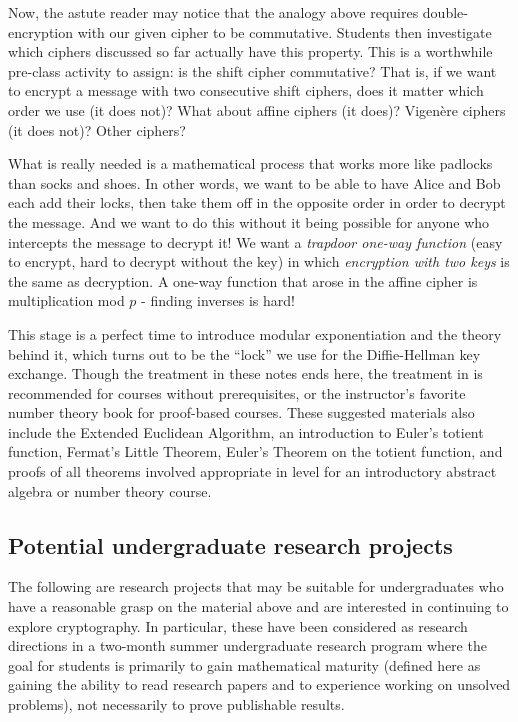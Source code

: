 \documentclass[11pt]{article}
\theoremstyle{plain}
\theoremstyle{remark}
\theoremstyle{definition}
\theoremstyle{definition}
\theoremstyle{definition}
\theoremstyle{plain}
\theoremstyle{plain}
\theoremstyle{plain}
\theoremstyle{definition}
\begin{document}
Now, the astute reader may notice that the analogy above requires
double-encryption with our given cipher to be commutative. Students
then investigate which ciphers discussed so far actually
have this property. This is a worthwhile pre-class activity to assign:
is the shift cipher commutative? That is, if we want to encrypt a
message with two consecutive shift ciphers, does it matter which order
we use (it does not)? What about affine ciphers (it does)? Vigen\`{e}re
ciphers (it does not)? Other ciphers?

What is really needed is a mathematical process that works more like
padlocks than socks and shoes. In other words, we want to be able to have
Alice and Bob each add their locks, then take them off in the opposite
order in order to decrypt the message. And we want to do this without
it being possible for anyone who intercepts the message to decrypt
it! We want a \emph{trapdoor one-way function} (easy to encrypt, hard
to decrypt without the key) in which \emph{encryption with two keys}
is the same as decryption. A one-way function that arose in the affine
cipher is multiplication mod $p$ - finding inverses is hard! 

This stage is a perfect time to introduce modular exponentiation\textit{
}and the theory behind it, which turns out to be the ``lock'' we
use for the Diffie-Hellman key exchange. Though the treatment in these
notes ends here, the treatment in \cite{mcdevittClassNotesCryptologic2012}
is recommended for courses without prerequisites, or the instructor's favorite number theory book
for proof-based courses. These suggested materials also include
the Extended Euclidean Algorithm, an introduction to Euler's totient function, Fermat's Little Theorem, 
Euler's Theorem on the totient function, and proofs of all theorems involved appropriate in level for an introductory abstract algebra or number theory course.

\subsection{\label{KI-subsec:Potential-Undergraduate-Research}Potential undergraduate
research projects}

The following are research projects that may be suitable for undergraduates who have a reasonable grasp on the material above and are interested in continuing to explore cryptography. In particular, these have been considered as research directions in a two-month summer undergraduate research program where the goal for students is primarily to gain mathematical maturity (defined here as gaining the ability to read research papers and to experience working on unsolved problems), not necessarily to prove publishable results.
\end{document}
